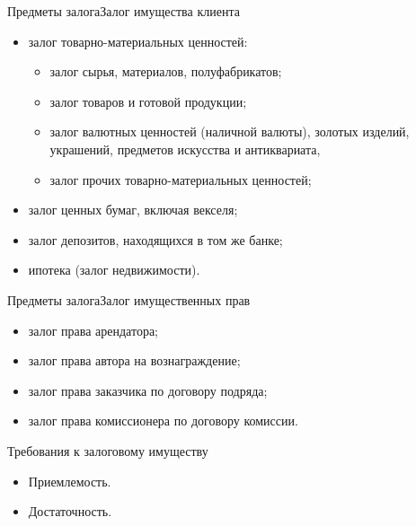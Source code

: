 \documentclass[_Banking_p3.tex]{subfiles}
\begin{document}
\begin{frame}{Предметы залога}{Залог имущества клиента}
\begin{itemize}

\item
залог товарно-материальных ценностей:
\begin{itemize}
\item
залог сырья, материалов, полуфабрикатов;

\item
залог товаров и готовой продукции;

\item
залог валютных ценностей (наличной валюты), золотых изделий, украшений, предметов искусства и антиквариата,

\item
залог прочих товарно-материальных ценностей;
\end{itemize}
\item
залог ценных бумаг, включая векселя;
\item
залог депозитов, находящихся в том же банке;
\item
ипотека (залог недвижимости). 

\end{itemize}
\end{frame}

\begin{frame}{Предметы залога}{Залог имущественных прав}
\begin{itemize}

\item
залог права арендатора;

\item
залог права автора на вознаграждение;

\item
залог права заказчика по договору подряда;

\item
залог права комиссионера по договору комиссии.

\end{itemize}
\end{frame}
\begin{frame}{Требования к залоговому имуществу}
\begin{itemize}[<+->]

\item
Приемлемость. 
\item
Достаточность.

\end{itemize}
\end{frame}
\end{document}
